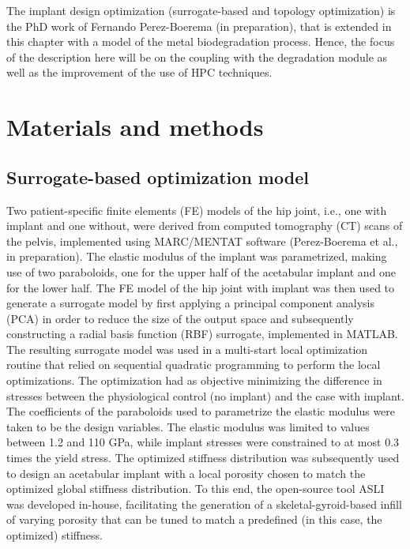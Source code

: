 The implant design optimization (surrogate-based and topology optimization) is the PhD work of Fernando Perez-Boerema (in preparation), that is extended in this chapter with a model of the metal biodegradation process. Hence, the focus of the description here will be on the coupling with the degradation module as well as the improvement of the use of {HPC} techniques.


\section{Materials and methods}

\subsection{Surrogate-based optimization model}

Two patient-specific finite elements (FE) models of the hip joint, i.e., one with implant and one without, were derived from computed tomography ({CT}) scans of the pelvis, implemented using MARC/MENTAT software (Perez-Boerema et al., in preparation). The elastic modulus of the implant was parametrized, making use of two paraboloids, one for the upper half of the acetabular implant and one for the lower half. The FE model of the hip joint with implant was then used to generate a surrogate model by first applying a principal component analysis ({PCA}) in order to reduce the size of the output space and subsequently constructing a radial basis function ({RBF}) surrogate, implemented in MATLAB. The resulting surrogate model was used in a multi-start local optimization routine that relied on sequential quadratic programming to perform the local optimizations. The optimization had as objective minimizing the difference in stresses between the physiological control (no implant) and the case with implant. The coefficients of the paraboloids used to parametrize the elastic modulus were taken to be the design variables. The elastic modulus was limited to values between 1.2 and 110 GPa, while implant stresses were constrained to at most 0.3 times the yield stress. The optimized stiffness distribution was subsequently used to design an acetabular implant with a local porosity chosen to match the optimized global stiffness distribution. To this end, the open-source tool ASLI \cite{Perez-Boerema2022} was developed in-house, facilitating the generation of a skeletal-gyroid-based infill of varying porosity that can be tuned to match a predefined (in this case, the optimized) stiffness.

